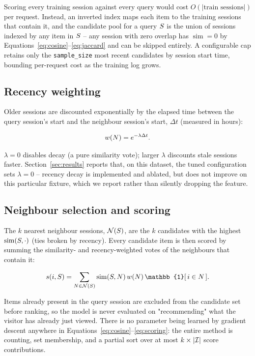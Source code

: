 Scoring every training session against every query would cost
$O(|\text{train sessions}|)$ per request. Instead, an inverted index maps
each item to the training sessions that contain it, and the candidate pool
for a query $S$ is the union of sessions indexed by any item in $S$ --
any session with zero overlap has $\operatorname{sim} = 0$ by
Equations~\ref{eq:cosine}--\ref{eq:jaccard} and can be skipped entirely. A
configurable cap retains only the \texttt{sample\_size} most recent candidates
by session start time, bounding per-request cost as the training log grows.

\subsection{Recency weighting}

Older sessions are discounted exponentially by the elapsed time between the
query session's start and the neighbour session's start, $\Delta t$ (measured
in hours):

\begin{equation}
  w(N) = e^{-\lambda \Delta t} .
  \label{eq:decay}
\end{equation}

$\lambda = 0$ disables decay (a pure similarity vote); larger $\lambda$
discounts stale sessions faster. Section~\ref{sec:results} reports that, on
this dataset, the tuned configuration sets $\lambda = 0$ -- recency decay is
implemented and ablated, but does not improve on this particular fixture,
which we report rather than silently dropping the feature.

\subsection{Neighbour selection and scoring}

The $k$ nearest neighbour sessions, $\mathcal{N}(S)$, are the $k$ candidates
with the highest $\operatorname{sim}(S, \cdot)$ (ties broken by recency).
Every candidate item is then scored by summing the similarity- and
recency-weighted votes of the neighbours that contain it:

\begin{equation}
  s(i, \Sset) = \sum_{\Nset \in \Nhood(\Sset)} \operatorname{sim}(\Sset, \Nset)\, w(\Nset)\, \mathbb{1}[\, i \in \Nset \,] .
  \label{eq:scoring}
\end{equation}

Items already present in the query session are excluded from the candidate
set before ranking, so the model is never evaluated on "recommending" what
the visitor has already just viewed. There is no parameter being learned by
gradient descent anywhere in Equations~\ref{eq:cosine}--\ref{eq:scoring}: the
entire method is counting, set membership, and a partial sort over at most
$k \times |\mathcal{I}|$ score contributions.

